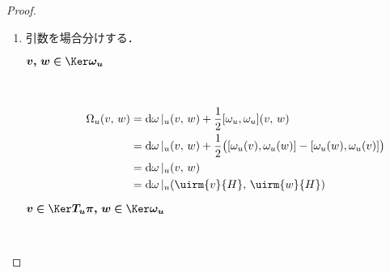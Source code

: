 \documentclass[geometry_main]{subfiles}
\begin{document}
\begin{proof}
    \begin{enumerate}
        \item 引数を場合分けする．
        \begin{description}
            \item[\textbf{$\bm{v,\, w \in \Ker \omega_u}$}]　
            
            \begin{align}
                \Omega_u (v,\, w) 
                &= \dd{\omega}|_u (v,\, w) + \frac{1}{2} \comm{\omega_u}{\omega_u} (v,\, w) \\
                &= \dd{\omega}|_u (v,\, w) + \frac{1}{2} \bigl(\comm{\omega_u(v)}{\omega_u(w)} - \comm{\omega_u(w)}{\omega_u(v)}\bigr) \\
                &= \dd{\omega}|_u (v,\, w) \\
                &= \dd{\omega}|_u (\uirm{v}{H},\, \uirm{w}{H})
            \end{align}
            
            \item[\textbf{$\bm{v \in \Ker T_u \pi,\, w \in \Ker \omega_u}$}]　
            

\end{description}
\end{enumerate}
\end{proof}
\end{document}
